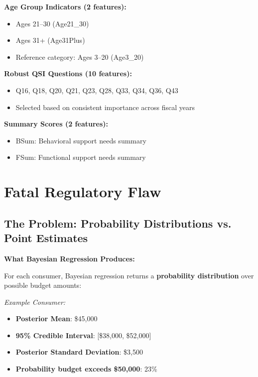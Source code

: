 \textbf{Age Group Indicators (2 features):}
\begin{itemize}
    \item Ages 21--30 (Age21\_30)
    \item Ages 31+ (Age31Plus)
    \item Reference category: Ages 3--20 (Age3\_20)
\end{itemize}

\textbf{Robust QSI Questions (10 features):}
\begin{itemize}
    \item Q16, Q18, Q20, Q21, Q23, Q28, Q33, Q34, Q36, Q43
    \item Selected based on consistent importance across fiscal years
\end{itemize}

\textbf{Summary Scores (2 features):}
\begin{itemize}
    \item BSum: Behavioral support needs summary
    \item FSum: Functional support needs summary
\end{itemize}


\section{Fatal Regulatory Flaw}

\subsection{The Problem: Probability Distributions vs. Point Estimates}

\textbf{What Bayesian Regression Produces:}

For each consumer, Bayesian regression returns a \textbf{probability distribution} over possible budget amounts:

\begin{center}
\textit{Example Consumer:}
\begin{itemize}
    \item \textbf{Posterior Mean}: \$45,000
    \item \textbf{95\% Credible Interval}: [\$38,000, \$52,000]
    \item \textbf{Posterior Standard Deviation}: \$3,500
    \item \textbf{Probability budget exceeds \$50,000}: 23\%
\end{itemize}
\end{center}

